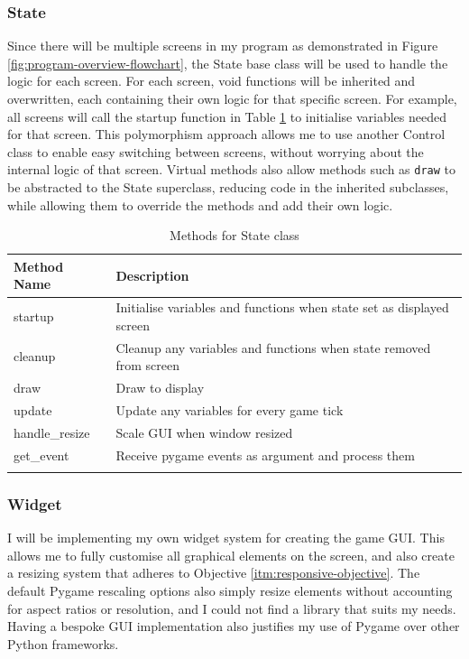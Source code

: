 \documentclass[../main/main.tex]{subfiles}
\begin{document}
\subsubsection*{State}
Since there will be multiple screens in my program as demonstrated in Figure \ref{fig:program-overview-flowchart}, the State base class will be used to handle the logic for each screen. For each screen, void functions will be inherited and overwritten, each containing their own logic for that specific screen. For example, all screens will call the startup function in Table \ref{tab:state-methods} to initialise variables needed for that screen. This polymorphism approach allows me to use another Control class to enable easy switching between screens, without worrying about the internal logic of that screen. Virtual methods also allow methods such as \lstinline[language=Python]{draw} to be abstracted to the State superclass, reducing code in the inherited subclasses, while allowing them to override the methods and add their own logic.

\begin{longtable}[c]{l|l}
    \toprule
    \textbf{Method Name} & \textbf{Description}\\
    \midrule
    \endfirsthead
    \endhead

    startup & Initialise variables and functions when state set as displayed screen\\
    cleanup & Cleanup any variables and functions when state removed from screen\\
    draw & Draw to display\\
    update & Update any variables for every game tick\\
    handle\_resize & Scale GUI when window resized\\
    get\_event & Receive pygame events as argument and process them\\

    \bottomrule

\caption{Methods for State class}
\label{tab:state-methods}
\end{longtable}

\subsubsection*{Widget}
\label{sec:design-widgets}
I will be implementing my own widget system for creating the game GUI. This allows me to fully customise all graphical elements on the screen, and also create a resizing system that adheres to Objective \ref{itm:responsive-objective}. The default Pygame rescaling options also simply resize elements without accounting for aspect ratios or resolution, and I could not find a library that suits my needs. Having a bespoke GUI implementation also justifies my use of Pygame over other Python frameworks.
\end{document}
